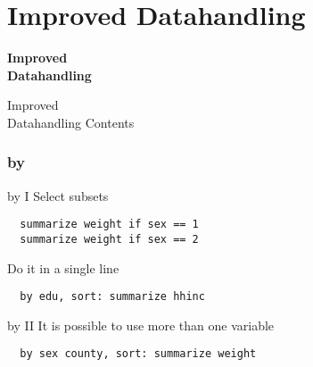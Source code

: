 \part{Improved Datahandling}
\begin{frame}
\thispagestyle{empty}
\textbf{\huge{Improved\\ Datahandling}}
\end{frame}

\begin{frame}{Improved\\ Datahandling Contents}
 \tableofcontents
\end{frame}

\section{by}
\begin{frame}[fragile]{by I}  
Select subsets
\begin{lstlisting}
  summarize weight if sex == 1
  summarize weight if sex == 2
\end{lstlisting}

Do it in a single line
\begin{lstlisting}
  by edu, sort: summarize hhinc
\end{lstlisting}

\end{frame}

\begin{frame}[fragile]{by II}
It is possible to use more than one variable 
\begin{lstlisting}
  by sex county, sort: summarize weight
\end{lstlisting}
\end{frame}


